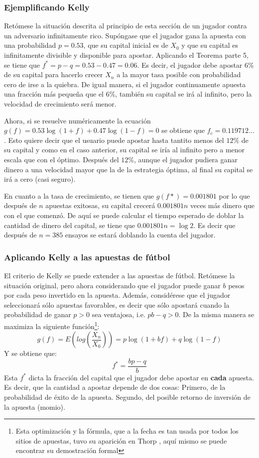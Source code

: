 \subsubsection{Ejemplificando Kelly} %
Retómese la situación descrita al principio de esta sección de un jugador contra un adversario infinitamente rico. Supóngase que el jugador gana la apuesta con una probabilidad $p=0.53$, que su capital inicial es de $X_0$ y que su capital es infinitamente divisible y disponible para apostar. Aplicando el Teorema parte 5, se tiene que $f^* = p-q =0.53-0.47 = 0.06$. Es decir, el jugador debe apostar $6\%$ de su capital para hacerlo crecer $X_n$ a la mayor tasa posible con probabilidad cero de irse a la quiebra. De igual manera, si el jugador continuamente apuesta una fracción más pequeña que el $6\%$, también su capital se irá al infinito, pero la velocidad de crecimiento será menor.

Ahora, si se resuelve numéricamente la ecuación $g(f) = 0.53\log(1+f)+0.47\log(1-f)=0$ se obtiene que $f_c= 0.119712...$. Esto quiere decir que el usuario puede apostar hasta tantito menos del $12\%$ de su capital y como en el caso anterior, su capital se iría al infinito pero a menor escala que con el óptimo. Después del $12\%$, aunque el jugador pudiera ganar dinero a una velocidad mayor que la de la estrategia óptima, al final su capital se irá a cero (casi seguro). 

En cuanto a la tasa de crecimiento, se tienen que $g(f*)= 0.001801$ por lo que después de $n$ apuestas exitosas, su capital crecerá $0.001801n$ veces más dinero que con el que comenzó. De aquí se puede calcular el tiempo esperado de doblar la cantidad de dinero del capital, se tiene que $0.001801n=\log2$. Es decir que después de $n=385$ ensayos se estará doblando la cuenta del jugador.

\subsubsection{Aplicando Kelly a las apuestas de fútbol} %
\label{subsubsection:aplicando_kelly_a_las_apuestas_de_fútbol}

El criterio de Kelly se puede extender a las apuestas de fútbol. Retómese la situación original, pero ahora considerando que el jugador puede ganar $b$ pesos por cada peso invertido en la apuesta. Además, considérese que el jugador seleccionará sólo apuestas favorables, es decir que sólo apostará cuando la probabilidad de ganar $p>0$ sea ventajosa, i.e. $pb - q > 0$.
De la misma manera se maximiza la siguiente función\footnote{Esta optimización y la fórmula, que a la fecha es tan usada por todos los sitios de apuestas, tuvo su aparición en  Thorp \cite{thorp1969optimal}, aquí mismo se puede encontrar su demostración formal}:
\[g(f) = E\left(log(\frac{X_n}{X_0})\right)=p\log(1+bf)+q\log(1-f)\]
Y se obtiene que:
\[f^* = \frac{bp -q}{b}\]
Esta $f^*$ dicta la fracción del capital que el jugador debe apostar en \textbf{cada} apuesta. Es decir, que la cantidad a apostar depende de dos cosas: Primero, de la probabilidad de éxito de la apuesta. Segundo, del posible retorno de inversión de la apuesta (momio).


